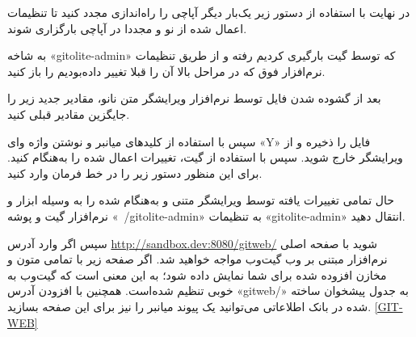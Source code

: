 \begin{latin}  
    
\end{latin}
در نهایت با استفاده از دستور زیر یک‌بار دیگر آپاچی را راه‌اندازی مجدد کنید تا تنظیمات اعمال شده از نو و مجددا در آپاچی بارگزاری شوند.
\newline

\begin{latin}  
    
\end{latin}
به شاخه «gitolite-admin» که توسط گیت بارگیری کردیم رفته و از طریق تنظیمات نرم‌افزار فوق که در مراحل بالا آن را قبلا تغییر داده‌بودیم را باز کنید.
\newline

\begin{latin}  
    
\end{latin}

بعد از گشوده شدن فایل توسط نرم‌افزار ویرایشگر متن نانو،  مقادیر جدید زیر را جایگزین مقادیر قبلی کنید.
\newline

\begin{latin}  
    
\end{latin}
سپس با استفاده از کلیدهای میانبر 
 و نوشتن واژه وای «Y» فایل را ذخیره و از ویرایشگر خارج شوید. سپس با استفاده از گیت، تغییرات اعمال شده را به‌هنگام کنید. برای این منظور دستور زیر را در خط فرمان وارد کنید.
\newline

\begin{latin}  
    
\end{latin}

حال تمامی تغییرات یافته توسط ویرایشگر متنی و به‌هنگام شده را به وسیله ابزار و نرم‌افزار گیت و پوشه «~/gitolite-admin» به تنظیمات «gitolite-admin» انتقال دهید.
\newline

\begin{latin}  
    
\end{latin}
سپس اگر وارد آدرس 
\url{http://sandbox.dev:8080/gitweb/}
شوید با صفحه اصلی نرم‌افزار مبتنی بر وب گیت‌وب
 مواجه خواهید شد. اگر صفحه زیر با تمامی متون و مخازن افزوده شده برای شما نمایش داده شود؛ به این معنی است که گیت‌وب به خوبی تنظیم شده‌است. همچنین با افزودن آدرس «gitweb/» به جدول پیشخوان ساخته شده در بانک اطلاعاتی می‌توانید یک پیوند میانبر را نیز برای این صفحه بسازید. \ref{GIT-WEB}

